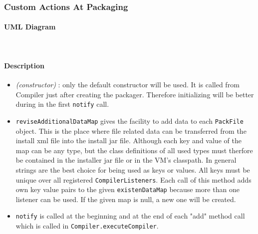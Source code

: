 \subsubsection{Custom Actions At Packaging}

\paragraph{UML Diagram}

\begin{center}
\end{center}\

\paragraph{Description}

\begin{itemize}

\item \textit{(constructor)} : only the default constructor will
be used. It is called from Compiler just after creating the packager.
Therefore initializing will be better during in the first \texttt{notify} call.

\item \texttt{reviseAdditionalDataMap} gives the facility to add
data to each \texttt{PackFile} object. This is the place where
file related data can be transferred from the install xml file
into the install jar file. Although each key and value of the map can be any
type, but the class definitions of all used types must therfore be contained
in the installer jar file or in the VM's classpath. In general strings
are the best choice for being used as keys or values. All keys must be
unique over all registered \texttt{CompilerListeners}. Each call of this
method adds own key value pairs to the given \texttt{existenDataMap} because
more than one listener can be used. If the given map is null, a
new one will be created.

\item \texttt{notify} is called at the beginning and at the end of each
"add" method call which is called in \texttt{Compiler.executeCompiler}.

\end{itemize}\

